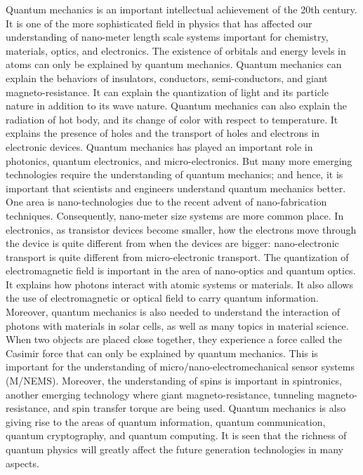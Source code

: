 \documentclass[
  9pt,
]{extbook}
\theoremstyle{definition}
\theoremstyle{definition}
\theoremstyle{definition}
\theoremstyle{remark}
\begin{document}
Quantum mechanics is an important intellectual achievement of the 20th century. It is one of the more sophisticated field in physics that has affected our understanding of nano-meter length scale systems important for chemistry, materials, optics, and electronics. The existence of orbitals and energy levels in atoms can only be explained by quantum mechanics. Quantum mechanics can explain the behaviors of insulators, conductors, semi-conductors, and giant magneto-resistance. It can explain the quantization of light and its particle nature in addition to its wave nature. Quantum mechanics can also explain the radiation of hot body, and its change of color with respect to temperature. It explains the presence of holes and the transport of holes and electrons in electronic devices.
Quantum mechanics has played an important role in photonics, quantum electronics, and micro-electronics. But many more emerging technologies require the understanding of quantum mechanics; and hence, it is important that scientists and engineers understand quantum mechanics better. One area is nano-technologies due to the recent advent of nano-fabrication techniques. Consequently, nano-meter size systems are more common place. In electronics, as transistor devices become smaller, how the electrons move through the device is quite different from when the devices are bigger: nano-electronic transport is quite different from micro-electronic transport.
The quantization of electromagnetic field is important in the area of nano-optics and quantum optics. It explains how photons interact with atomic systems or materials. It also allows the use of electromagnetic or optical field to carry quantum information. Moreover, quantum mechanics is also needed to understand the interaction of photons with materials in solar cells, as well as many topics in material science.
When two objects are placed close together, they experience a force called the Casimir force that can only be explained by quantum mechanics. This is important for the understanding of micro/nano-electromechanical sensor systems (M/NEMS). Moreover, the understanding of spins is important in spintronics, another emerging technology where giant magneto-resistance, tunneling magneto-resistance, and spin transfer torque are being used.
Quantum mechanics is also giving rise to the areas of quantum information, quantum communication, quantum cryptography, and quantum computing. It is seen that the richness
of quantum physics will greatly affect the future generation technologies in many aspects.
\end{document}

